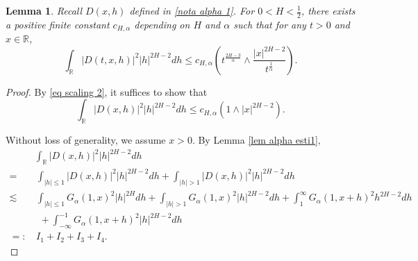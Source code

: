 \documentclass[11pt,reqno]{amsart}
\numberwithin{equation}{section}
\newtheorem{lemma}{Lemma}[section]
\newcommand{\1}{{\bf 1}}
\newcommand{\2}{{\bf 2}}
\begin{document}
 \begin{lemma}\label{prop alpha esti1} Recall $D(x,h)$ defined in \eqref{nota alpha  1}.  For $0<H<\frac{1}2$,  there exists a positive finite constant $c_{H,\alpha}$ depending on $H$ and $\alpha$ such that for any $t>0$  and $x\in\mathbb{R}$,
\begin{equation}\label{eq alpha esti1-1}
\int_{\mathbb{R}} \left|D(t,x,h)\right|^2|h|^{2H-2}dh\le c_{H,\alpha}\left (t^{\frac{2H-3}{\alpha}}\wedge\frac{|x|^{2H-2}}{t^{\frac1{\alpha}}}\right).
\end{equation}
\end{lemma}
\begin{proof}
By \eqref{eq scaling 2}, it suffices to show that 
 \begin{equation}\label{eq alpha esti1}
\int_{\mathbb{R}} \left|D(x,h)\right|^2|h|^{2H-2}dh\le c_{H,\alpha}\left (1\wedge|x|^{2H-2}\right).
\end{equation}

Without loss of  generality,  we assume $x>0$.  By Lemma \ref{lem alpha esti1},
\begin{align*}
& \int_{\mathbb{R}}  \left|D(x,h)\right|^2|h|^{2H-2}dh\\
=&\, \int_{|h|\le 1} \left|D(x,h)\right|^2|h|^{2H-2}dh+\int_{|h|>1} \left|D(x,h)\right|^2|h|^{2H-2}dh\\
 \lesssim &\,  \int_{|h|\le 1} G_{\alpha}(1,x)^2|h|^{2H}dh+\int_{|h|>1} G_{\alpha}(1,x)^2|h|^{2H-2}dh+\int_1^{\infty}  G_{\alpha}(1,x+h)^2 h^{2H-2}dh\\
 & \,\,\, + \int_{-\infty}^{-1}  G_{\alpha}(1,x+h)^2 |h|^{2H-2}dh\\
 =: &\, I_1+I_2+I_3+I_4.
 \end{align*}


\end{proof}
\end{document}

